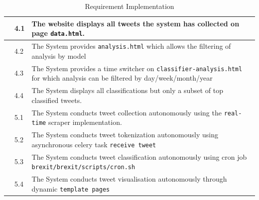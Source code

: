 \documentclass[11pt]{report}
\begin{document}
\begin{landscape}
\begin{table}[]
\begin{tabular}{ |>{\raggedright\arraybackslash}p{3.75cm}|p{1cm}|>{\raggedright\arraybackslash}p{14cm}|}
\hline \hline
\multirow{3}{*}{4. Visualization} 
							   & 4.1         & The website displays all tweets the system has collected on page \texttt{data.html}.                                                                                           \\
							   \cline{2-3}
                                  & 4.2         & The System provides \texttt{analysis.html} which allows the filtering of analysis by model\\
                                 \cline{2-3}
                                  & 4.3         &  The System provides a time switcher on \texttt{classifier-analysis.html} for which analysis can be filtered by day/week/month/year\\
                                  \cline{2-3}
                                  & 4.4         &  The System displays all classifications but only a subset of top classified tweets.\\
\hline \hline
\multirow{3}{*}{5. Automation} 
							   & 5.1         & The System conducts tweet collection autonomously using the \texttt{real-time} scraper implementation.                                                                                          \\
							   \cline{2-3}
                                  & 5.2         & The System conducts tweet tokenization autonomously using asynchronous celery task \texttt{receive tweet}\\
                                 \cline{2-3}
                                  & 5.3         & The System conducts tweet classification autonomously using cron job \texttt{brexit/brexit/scripts/cron.sh} \\
                                  \cline{2-3}
                                  & 5.4         &  The System conducts tweet visualisation autonomously through dynamic \texttt{template pages}\\
\hline                                                                                                   
\end{tabular}
\caption{Requirement Implementation}
\label{table:requirements}
\end{table}
\end{landscape}
\restoregeometry %
\end{document}
